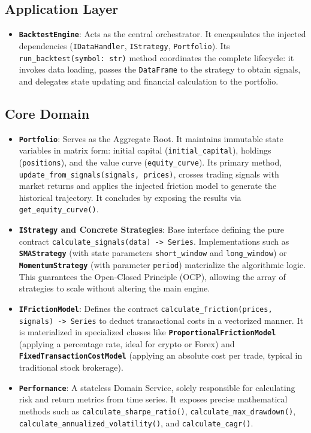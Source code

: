 \subsection{Application Layer}
\begin{itemize}
    \item \textbf{\texttt{BacktestEngine}}: Acts as the central orchestrator. It encapsulates the injected dependencies (\texttt{IDataHandler}, \texttt{IStrategy}, \texttt{Portfolio}). Its \texttt{run\_backtest(symbol: str)} method coordinates the complete lifecycle: it invokes data loading, passes the \texttt{DataFrame} to the strategy to obtain signals, and delegates state updating and financial calculation to the portfolio.
\end{itemize}

\subsection{Core Domain}
\begin{itemize}
    \item \textbf{\texttt{Portfolio}}: Serves as the Aggregate Root. It maintains immutable state variables in matrix form: initial capital (\texttt{initial\_capital}), holdings (\texttt{positions}), and the value curve (\texttt{equity\_curve}). Its primary method, \texttt{update\_from\_signals(signals, prices)}, crosses trading signals with market returns and applies the injected friction model to generate the historical trajectory. It concludes by exposing the results via \texttt{get\_equity\_curve()}.
    
    \item \textbf{\texttt{IStrategy} and Concrete Strategies}: Base interface defining the pure contract \texttt{calculate\_signals(data) \allowbreak -> Series}. Implementations such as \textbf{\texttt{SMAStrategy}} (with state parameters \texttt{short\_window} and \texttt{long\_window}) or \textbf{\texttt{MomentumStrategy}} (with parameter \texttt{period}) materialize the algorithmic logic. This guarantees the Open-Closed Principle (OCP), allowing the array of strategies to scale without altering the main engine.
    
    \item \textbf{\texttt{IFrictionModel}}: Defines the contract \texttt{calculate\_friction(prices, \allowbreak signals) \allowbreak -> Series} to deduct transactional costs in a vectorized manner. It is materialized in specialized classes like \textbf{\texttt{ProportionalFrictionModel}} (applying a percentage rate, ideal for crypto or Forex) and \textbf{\texttt{FixedTransactionCostModel}} (applying an absolute cost per trade, typical in traditional stock brokerage).
    
    \item \textbf{\texttt{Performance}}: A stateless Domain Service, solely responsible for calculating risk and return metrics from time series. It exposes precise mathematical methods such as \texttt{calculate\_sharpe\_ratio()}, \texttt{calculate\_max\_drawdown()}, \texttt{calculate\_\allowbreak annualized\_\allowbreak volatility()}, and \texttt{calculate\_cagr()}.
\end{itemize}

